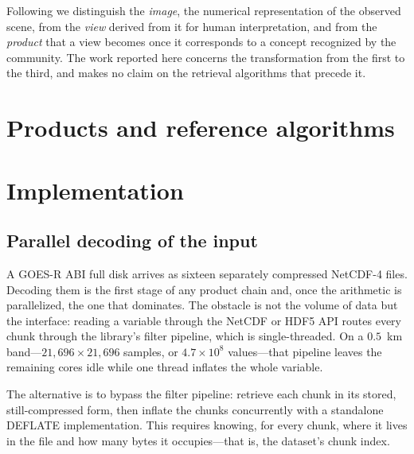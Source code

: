 \documentclass{ametsocV6.1}
\begin{document}
Following \citet{LiraChavez2010} we distinguish the \emph{image}, the numerical
representation of the observed scene, from the \emph{view} derived from it for
human interpretation, and from the \emph{product} that a view becomes once it
corresponds to a concept recognized by the community. The work reported here
concerns the transformation from the first to the third, and makes no claim on
the retrieval algorithms that precede it.

\section{Products and reference algorithms}
\label{sec:algorithms}


\section{Implementation}
\label{sec:implementation}

\subsection{Parallel decoding of the input}
\label{sec:decoding}

A GOES-R ABI full disk arrives as sixteen separately compressed NetCDF-4 files.
Decoding them is the first stage of any product chain and, once the arithmetic
is parallelized, the one that dominates. The obstacle is not the volume of data
but the interface: reading a variable through the NetCDF or HDF5 API routes
every chunk through the library's filter pipeline, which is single-threaded. On
a $0.5$~km band---$21{,}696 \times 21{,}696$ samples, or $4.7 \times 10^{8}$
values---that pipeline leaves the remaining cores idle while one thread
inflates the whole variable.

The alternative is to bypass the filter pipeline: retrieve each chunk in its
stored, still-compressed form, then inflate the chunks concurrently with a
standalone DEFLATE implementation. This requires knowing, for every chunk,
where it lives in the file and how many bytes it occupies---that is, the
dataset's chunk index.
\end{document}
